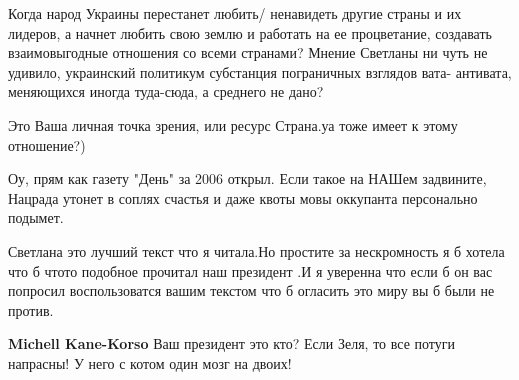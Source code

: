 \begin{itemize}
 

Когда народ Украины перестанет любить/ ненавидеть другие страны и их лидеров, а
начнет любить свою землю и работать на ее процветание, создавать взаимовыгодные
отношения со всеми странами? Мнение Светланы ни чуть не удивило, украинский
политикум субстанция пограничных взглядов вата- антивата, меняющихся иногда
туда-сюда, а среднего не дано?

 

Это Ваша личная точка зрения, или ресурс Страна.уа тоже имеет к этому отношение?)

 

Оу, прям как газету "День" за 2006 открыл. Если такое на НАШем задвините,
Нацрада утонет в соплях счастья и даже квоты мовы оккупанта персонально
подымет.

 

Светлана это лучший текст что я читала.Но простите за нескромность я б хотела
что б чтото подобное прочитал наш президент .И я уверенна что если б он вас
попросил воспользоватся вашим текстом что б огласить это миру вы б были не
против.

\begin{itemize}
 
\textbf{Michell Kane-Korso} Ваш президент это кто? Если Зеля, то все потуги напрасны! У него с котом один мозг на двоих!

 


\end{itemize}
\end{itemize}
